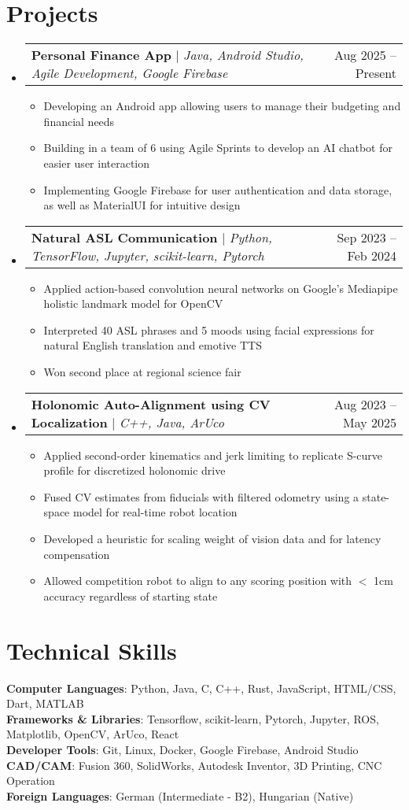 \documentclass[letterpaper,11pt]{article}
\makeatletter
\newcommand{\resumeItem}[1]{
  \item\small{
    {#1 \vspace{-2pt}}
  }
}
\newcommand{\resumeProjectHeading}[2]{
    \item
    \begin{tabular*}{0.97\textwidth}{l@{\extracolsep{\fill}}r}
      \small#1 & #2 \\
    \end{tabular*}\vspace{-7pt}
}
\newcommand{\resumeSubHeadingListStart}{\begin{itemize}[leftmargin=0.15in, label={}]}
\newcommand{\resumeSubHeadingListEnd}{\end{itemize}}
\newcommand{\resumeItemListStart}{\begin{itemize}}
\newcommand{\resumeItemListEnd}{\end{itemize}\vspace{-5pt}}
\makeatother
\begin{document}
\section{Projects}
    \resumeSubHeadingListStart
        \resumeProjectHeading
          {\textbf{Personal Finance App} $|$ \emph{Java, Android Studio, Agile Development, Google Firebase}}{Aug 2025 -- Present}
          \resumeItemListStart
            \resumeItem{Developing an Android app allowing users to manage their budgeting and financial needs}
            \resumeItem{Building in a team of 6 using Agile Sprints to develop an AI chatbot for easier user interaction}
            \resumeItem{Implementing Google Firebase for user authentication and data storage, as well as MaterialUI for intuitive design}
          \resumeItemListEnd
          \resumeProjectHeading
          {\textbf{Natural ASL Communication} $|$ \emph{Python, TensorFlow, Jupyter, scikit-learn, Pytorch}}{Sep 2023 -- Feb 2024}
          \resumeItemListStart
            \resumeItem{Applied action-based convolution neural networks on Google's Mediapipe holistic landmark model for OpenCV}
            \resumeItem{Interpreted 40 ASL phrases and 5 moods using facial expressions for natural English translation and emotive TTS}
            \resumeItem{Won second place at regional science fair}
          \resumeItemListEnd
      \resumeProjectHeading
          {\textbf{Holonomic Auto-Alignment using CV Localization} $|$ \emph{C++, Java, ArUco}}{Aug 2023 -- May 2025}
          \resumeItemListStart
            \resumeItem{Applied second-order kinematics and jerk limiting to replicate S-curve profile for discretized holonomic drive}
            \resumeItem{Fused CV estimates from fiducials with filtered odometry using a state-space model for real-time robot location}
            \resumeItem{Developed a heuristic for scaling weight of vision data and for latency compensation}
            \resumeItem{Allowed competition robot to align to any scoring position with $<$ 1cm accuracy regardless of starting state}
          \resumeItemListEnd
    \resumeSubHeadingListEnd



%
\section{Technical Skills}
 \begin{itemize}[leftmargin=0.15in, label={}]
    \small{\item{
     \textbf{Computer Languages}{: Python, Java, C, C++, Rust, JavaScript, HTML/CSS, Dart, MATLAB} \\
     \textbf{Frameworks \& Libraries}{: Tensorflow, scikit-learn, Pytorch, Jupyter, ROS, Matplotlib, OpenCV, ArUco, React} \\
     \textbf{Developer Tools}{: Git, Linux, Docker, Google Firebase, Android Studio} \\
     \textbf{CAD/CAM}{: Fusion 360, SolidWorks, Autodesk Inventor, 3D Printing, CNC Operation} \\
     \textbf{Foreign Languages}{: German (Intermediate - B2), Hungarian (Native)}
    }}
 \end{itemize}


\end{document}
